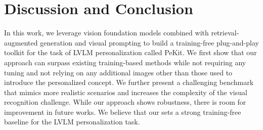 \vspace{-0.3cm}
\section{Discussion and Conclusion}
\vspace{-0.25cm}
In this work, we leverage vision foundation models combined with retrieval-augmented generation and visual prompting to build a training-free plug-and-play toolkit for the task of LVLM personalization called PeKit. We first show that our approach can surpass existing training-based methods while not requiring any tuning and not relying on any additional images other than those used to introduce the personalized concept. We further present a challenging benchmark that mimics more realistic scenarios and increases the complexity of the visual recognition challenge. While our approach shows robustness, there is room for improvement in future works. We believe that our \ours  sets a strong training-free baseline for the LVLM personalization task.
\label{sec:conclusion}